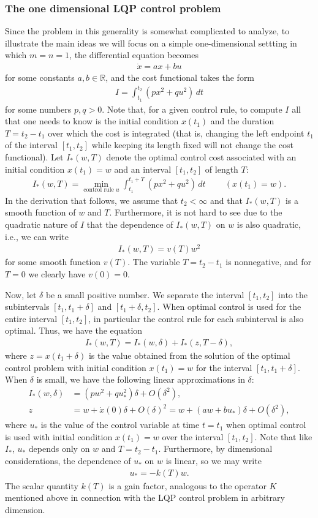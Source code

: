 \documentclass[12pt]{amsart}
\newcommand{\eq}[1]{\begin{equation}\begin{split}#1\end{split}\end{equation}}
\newcommand{\eqst}[1]{\begin{align*}#1\end{align*}}
\begin{document}
\subsubsection{The one dimensional LQP control problem} Since the problem in this generality is somewhat complicated to analyze, to illustrate the main ideas we will focus on a simple one-dimensional settting in which $m=n=1$, the differential equation becomes
\eqst{
\dot{x} = ax+bu 
}
for some constants $a,b\in\mathbb{R}$, and the cost functional takes the form
\eqst{
I = \int_{t_1}^{t_2} (px^2+qu^2)\,dt
}
for some numbers $p,q>0$. Note that, for a given control rule, to compute $I$ all that one needs to know is the initial condition $x(t_1)$ and the duration $T=t_2-t_1$ over which the cost is integrated (that is, changing the left endpoint $t_1$ of the interval $[t_1,t_2]$ while keeping its length fixed will not change the cost functional). Let $I_*(w,T)$ denote the optimal control cost associated with an initial condition $x(t_1)=w$ and an interval $[t_1,t_2]$ of length $T$:
\eqst{
I_*(w,T) = \min_{\textrm{control rule $u$}} \int_{t_1}^{t_1+T} (p x^2+qu^2)\,dt
\ \qquad (x(t_1)=w).
}
In the derivation that follows, we assume that $t_2<\infty$ and that $I_*(w,T)$ is a smooth function of $w$ and $T$. Furthermore, it is not hard to see due to the quadratic nature of $I$ that the dependence of $I_*(w,T)$ on $w$ is also quadratic, i.e., we can write
\eqst{
I_*(w,T) = v(T) w^2
}
for some smooth function $v(T)$. The variable $T=t_2-t_1$ is nonnegative, and for $T=0$ we clearly have $v(0)=0$.

Now, let $\delta$ be a small positive number. We separate the interval $[t_1,t_2]$ into the subintervals $[t_1,t_1+\delta]$ and $[t_1+\delta,t_2]$. When optimal control is used for the entire interval $[t_1,t_2]$, in particular the control rule for each subinterval is also optimal. Thus, we have the equation
\eq{ \label{eq:lqp-subintervals}
I_*(w,T) = I_*(w,\delta) + I_*(z,T-\delta),
}
where $z=x(t_1+\delta)$ is the value obtained from the solution of the optimal control problem with initial condition $x(t_1)=w$ for the interval $[t_1,t_1+\delta]$. When $\delta$ is small, we have the following linear approximations in $\delta$:
\eq{ \label{eq:lqp-approx}
I_*(w,\delta) &= (p w^2 + q u_*^2)\delta + O(\delta^2), \\ 
z &= w + \dot{x}(0)\delta + O(\delta)^2 = w + (aw+b u_*)\delta + O(\delta^2),
}
where $u_*$ is the value of the control variable at time $t=t_1$ when optimal control is used with initial condition $x(t_1)=w$ over the interval $[t_1,t_2]$. Note that like $I_*$, $u_*$ depends only on $w$ and $T=t_2-t_1$. Furthermore, by dimensional considerations, the dependence of $u_*$ on $w$ is linear, so we may write
\eqst{
u_* = - k(T)w. 
}
The scalar quantity $k(T)$ is a gain factor, analogous to the operator $K$ mentioned above in connection with the LQP control problem in arbitrary dimension.
\end{document}
